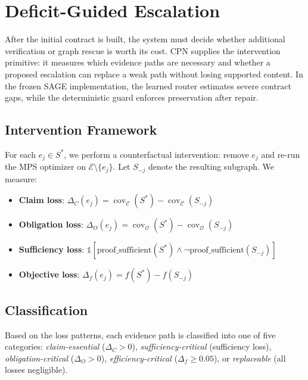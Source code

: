 \documentclass[journal,onecolumn,11pt]{IEEEtran}
\begin{document}
\section{Deficit-Guided Escalation}
\label{sec:cpn}

After the initial contract is built, the system must decide whether additional verification or graph rescue is worth its cost. CPN supplies the intervention primitive: it measures which evidence paths are necessary and whether a proposed escalation can replace a weak path without losing supported content. In the frozen SAGE implementation, the learned router estimates severe contract gaps, while the deterministic guard enforces preservation after repair.

\subsection{Intervention Framework}

For each $e_j \in S^*$, we perform a counterfactual intervention: remove $e_j$ and re-run the MPS optimizer on $\mathcal{E} \setminus \{e_j\}$. Let $S_{-j}$ denote the resulting subgraph. We measure:

\begin{itemize}
\item \textbf{Claim loss}: $\Delta_C(e_j) = \operatorname{cov}_{\mathcal{C}}(S^*) - \operatorname{cov}_{\mathcal{C}}(S_{-j})$
\item \textbf{Obligation loss}: $\Delta_O(e_j) = \operatorname{cov}_{\mathcal{O}}(S^*) - \operatorname{cov}_{\mathcal{O}}(S_{-j})$
\item \textbf{Sufficiency loss}: $\mathbb{1}[\text{proof\_sufficient}(S^*) \wedge \neg\text{proof\_sufficient}(S_{-j})]$
\item \textbf{Objective loss}: $\Delta_f(e_j) = f(S^*) - f(S_{-j})$
\end{itemize}

\subsection{Classification}

Based on the loss patterns, each evidence path is classified into one of five categories: \textit{claim-essential} ($\Delta_C > 0$), \textit{sufficiency-critical} (sufficiency loss), \textit{obligation-critical} ($\Delta_O > 0$), \textit{efficiency-critical} ($\Delta_f \geq 0.05$), or \textit{replaceable} (all losses negligible).
\end{document}
